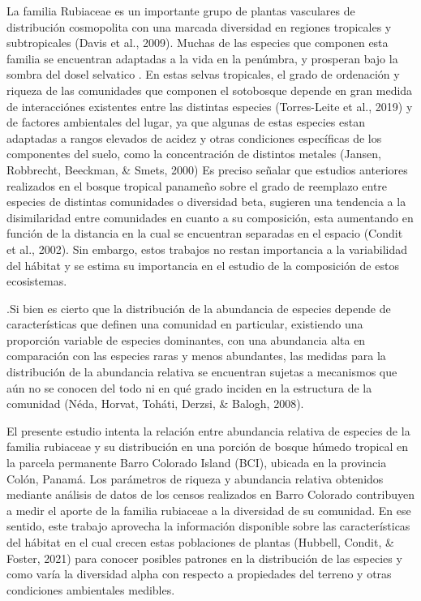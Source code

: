 \documentclass[11pt,]{article}
\begin{document}
La familia Rubiaceae es un importante grupo de plantas vasculares de
distribución cosmopolita con una marcada diversidad en regiones
tropicales y subtropicales (Davis et al., 2009). Muchas de las especies
que componen esta familia se encuentran adaptadas a la vida en la
penúmbra, y prosperan bajo la sombra del dosel selvatico . En estas
selvas tropicales, el grado de ordenación y riqueza de las comunidades
que componen el sotobosque depende en gran medida de interacciónes
existentes entre las distintas especies (Torres-Leite et al., 2019) y de
factores ambientales del lugar, ya que algunas de estas especies estan
adaptadas a rangos elevados de acidez y otras condiciones específicas de
los componentes del suelo, como la concentración de distintos metales
(Jansen, Robbrecht, Beeckman, \& Smets, 2000) Es preciso señalar que
estudios anteriores realizados en el bosque tropical panameño sobre el
grado de reemplazo entre especies de distintas comunidades o diversidad
beta, sugieren una tendencia a la disimilaridad entre comunidades en
cuanto a su composición, esta aumentando en función de la distancia en
la cual se encuentran separadas en el espacio (Condit et al., 2002). Sin
embargo, estos trabajos no restan importancia a la variabilidad del
hábitat y se estima su importancia en el estudio de la composición de
estos ecosistemas.

.Si bien es cierto que la distribución de la abundancia de especies
depende de características que definen una comunidad en particular,
existiendo una proporción variable de especies dominantes, con una
abundancia alta en comparación con las especies raras y menos
abundantes, las medidas para la distribución de la abundancia relativa
se encuentran sujetas a mecanismos que aún no se conocen del todo ni en
qué grado inciden en la estructura de la comunidad (Néda, Horvat,
Toháti, Derzsi, \& Balogh, 2008).

El presente estudio intenta la relación entre abundancia relativa de
especies de la familia rubiaceae y su distribución en una porción de
bosque húmedo tropical en la parcela permanente Barro Colorado Island
(BCI), ubicada en la provincia Colón, Panamá. Los parámetros de riqueza
y abundancia relativa obtenidos mediante análisis de datos de los censos
realizados en Barro Colorado contribuyen a medir el aporte de la familia
rubiaceae a la diversidad de su comunidad. En ese sentido, este trabajo
aprovecha la información disponible sobre las características del
hábitat en el cual crecen estas poblaciones de plantas (Hubbell, Condit,
\& Foster, 2021) para conocer posibles patrones en la distribución de
las especies y como varía la diversidad alpha con respecto a propiedades
del terreno y otras condiciones ambientales medibles.
\end{document}
